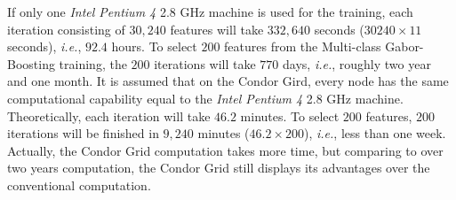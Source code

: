 If only one \textit{Intel Pentium 4} 2.8 GHz machine is used for the training, each iteration consisting of $30,240$ features will take $332,640$ seconds ($30240\times 11$ seconds), \textit{i.e.}, $92.4$ hours. To select $200$ features from the Multi-class Gabor-Boosting training, the $200$ iterations will take $770$ days, \textit{i.e.}, roughly two year and one month. It is assumed that on the Condor Gird, every node has the same computational capability equal to the \textit{Intel Pentium 4} 2.8 GHz machine. Theoretically, each iteration will take $46.2$ minutes. To select $200$ features, $200$ iterations will be finished in $9,240$ minutes ($46.2\times 200$), \textit{i.e.}, less than one week. Actually, the Condor Grid computation takes more time, but comparing to over two years computation, the Condor Grid still displays its advantages over the conventional computation.

